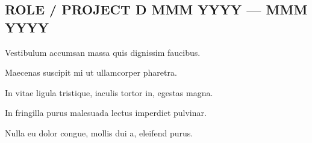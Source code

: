 \documentclass[letter,10pt]{article}
\begin{document}
\subsection{{ROLE / PROJECT D \hfill MMM YYYY --- MMM YYYY}}
\begin{zitemize}
\item Vestibulum accumsan massa quis dignissim faucibus.
\item Maecenas suscipit mi ut ullamcorper pharetra.
\item In vitae ligula tristique, iaculis tortor in, egestas magna.
\item In fringilla purus malesuada lectus imperdiet pulvinar.
\item Nulla eu dolor congue, mollis dui a, eleifend purus.
\end{zitemize}

\end{document}
